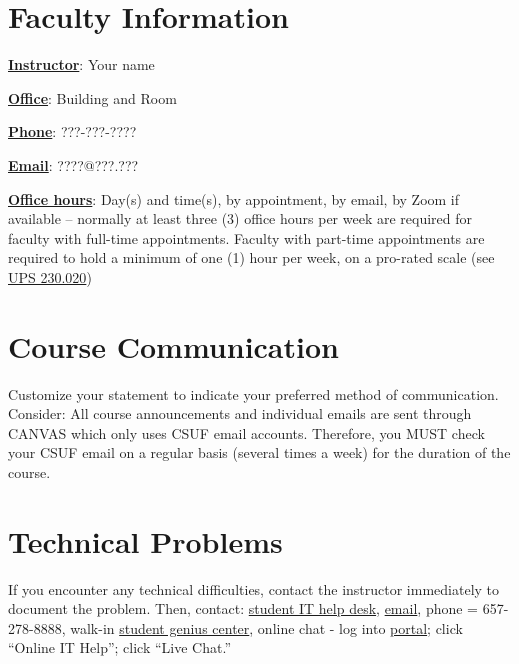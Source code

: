 \documentclass[12pt]{article}
\begin{document}
\vspace{2em}

\section{Faculty Information}

\textbf{\uline{Instructor}}: Your name

\textbf{\uline{Office}}: Building and Room

\textbf{\uline{Phone}}: ???-???-????

\textbf{\uline{Email}}: ????@???.???

\textbf{\uline{Office hours}}: {\color{suggestionred}Day(s) and time(s), by appointment, by email, by Zoom if available} {\color{annotationblue}-- normally at least three (3) office hours per week are required for faculty with full-time appointments. Faculty with part-time appointments are required to hold a minimum of one (1) hour per week, on a pro-rated scale (see \href{https://www.fullerton.edu/senate/publications_policies_resolutions/ups/UPS\%20200/UPS\%20230.020.pdf}{UPS 230.020})}

\section{Course Communication}

{\color{annotationblue}Customize your statement to indicate your preferred method of communication.} {\color{suggestionred}Consider: All course announcements and individual emails are sent through CANVAS which only uses CSUF email accounts. Therefore, you MUST check your CSUF email on a regular basis (several times a week) for the duration of the course.}

\section{Technical Problems}

{\color{suggestionred}If you encounter any technical difficulties, contact the instructor immediately to document the problem. Then, contact: \href{http://www.fullerton.edu/it/students/helpdesk/index.php}{student IT help desk}, \href{mailto:StudentITHelpDesk@fullerton.edu}{email}, phone = 657-278-8888, walk-in \href{http://www.fullerton.edu/it/students/sgc/index.php}{student genius center}, online chat - log into \href{http://my.fullerton.edu}{portal}; click ``Online IT Help''; click ``Live Chat.''}
\end{document}
